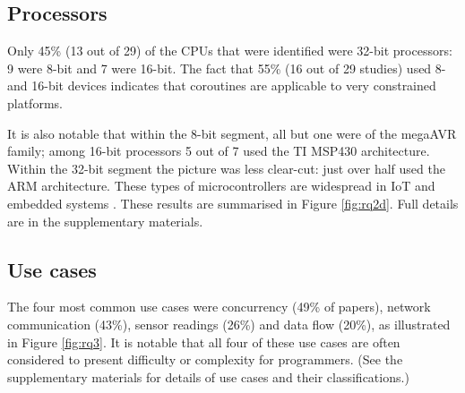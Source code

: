 \documentclass[format=acmsmall, review=false, screen=false]{acmart}
\begin{document}
\subsection{Processors}

Only 45\% (13 out of 29) of the CPUs that were identified were 32-bit processors: 9 were 8-bit and 7 were 16-bit. The fact that 55\% (16 out of 29 studies) used 8- and 16-bit devices indicates that coroutines are applicable to very constrained platforms.

It is also notable that within the 8-bit segment, all but one were of the megaAVR family; among 16-bit processors 5 out of 7 used the TI MSP430 architecture. Within the 32-bit segment the picture was less clear-cut: just over half used the ARM architecture. These types of microcontrollers are widespread in IoT and embedded systems \cite{AspenCore2017}. These results are summarised in Figure \ref{fig:rq2d}. Full details are in the supplementary materials.

\subsection{Use cases}

The four most common use cases were concurrency (49\% of papers), network communication (43\%), sensor readings (26\%) and data flow (20\%), as illustrated in Figure \ref{fig:rq3}. It is notable that all four of these use cases are often considered to present difficulty or complexity for programmers. (See the supplementary materials for details of use cases and their classifications.)
\end{document}
